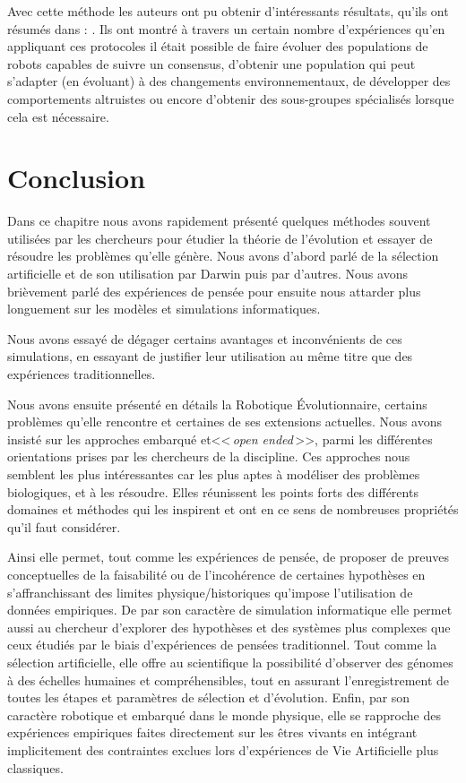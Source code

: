 Avec cette méthode les auteurs ont pu obtenir d'intéressants résultats, qu'ils ont résumés dans : \cite{bredeche2012environmentdrivenopenende}. Ils ont montré à travers un certain nombre d'expériences qu'en appliquant ces protocoles il était possible de faire évoluer des populations de robots capables de suivre un consensus, d'obtenir une population qui peut s'adapter (en évoluant) à des changements environnementaux, de développer des comportements altruistes ou encore d'obtenir des sous-groupes spécialisés lorsque cela est nécessaire.



\section{Conclusion}

Dans ce chapitre nous avons rapidement présenté quelques méthodes souvent utilisées par les chercheurs pour étudier la théorie de l'évolution et essayer de résoudre les problèmes qu'elle génère. Nous avons d'abord parlé de la sélection artificielle et de son utilisation par Darwin puis par d'autres. Nous avons brièvement parlé des expériences de pensée pour ensuite nous attarder plus longuement sur les modèles et simulations informatiques.

Nous avons essayé de dégager certains avantages et inconvénients de ces simulations, en essayant de justifier leur utilisation au même titre que des expériences traditionnelles.

Nous avons ensuite présenté en détails la Robotique \'Evolutionnaire, certains problèmes qu'elle rencontre et certaines de ses extensions actuelles. Nous avons insisté sur les approches embarqué et<<\,\emph{open ended}\,>>, parmi les différentes orientations prises par les chercheurs de la discipline. Ces approches nous semblent les plus intéressantes car les plus aptes à modéliser des problèmes biologiques, et à les résoudre. Elles réunissent les points forts des différents domaines et méthodes qui les inspirent et ont en ce sens de nombreuses propriétés qu'il faut considérer.

Ainsi elle permet, tout comme les expériences de pensée, de proposer de preuves conceptuelles de la faisabilité ou de l'incohérence de certaines hypothèses en s'affranchissant des limites physique/historiques qu'impose l'utilisation de données empiriques. De par son caractère de simulation informatique elle permet aussi au chercheur d'explorer des hypothèses et des systèmes plus complexes que ceux étudiés par le biais d'expériences de pensées traditionnel. Tout comme la sélection artificielle, elle offre au scientifique la possibilité d'observer des génomes à des échelles humaines et compréhensibles, tout en assurant l'enregistrement de toutes les étapes et paramètres de sélection et d'évolution. Enfin, par son caractère robotique et embarqué dans le monde physique, elle se rapproche des expériences empiriques faites directement sur les êtres vivants en intégrant implicitement des contraintes exclues lors d'expériences de Vie Artificielle plus classiques.

